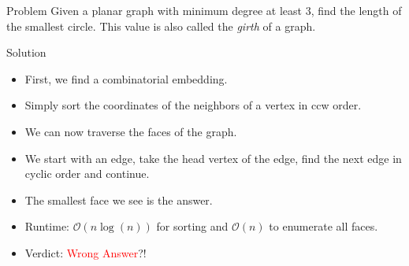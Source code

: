 \begin{slide}
	\begin{block}{Problem}
		Given a planar graph with minimum degree at least $3$, find the length of the smallest circle.
		This value is also called the \emph{girth} of a graph.
	\end{block}
	\pause
	\begin{block}{Solution}
		\begin{itemize}
			\item First, we find a combinatorial embedding.
			\item Simply sort the coordinates of the neighbors of a vertex in ccw order.
			\pause
			\smallskip
			\item We can now traverse the faces of the graph.
			\item We start with an edge, take the head vertex of the edge, find the next edge in cyclic order and continue.
			\pause
			\smallskip
			\item The smallest face we see is the answer.
			\item Runtime: $\mathcal{O}(n\log(n))$ for sorting and $\mathcal{O}(n)$ to enumerate all faces.
			\pause
			\item Verdict: \textcolor{red}{Wrong Answer}\pause?!
		\end{itemize}
	\end{block}
\end{slide}

